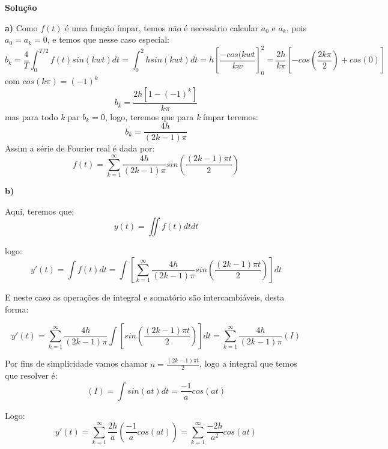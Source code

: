 \linespread{1.5}

\textbf{Solução}

\textbf{a)}
Como $f(t)$ é uma função ímpar, temos não é necessário calcular $a_0$ e $a_k$, pois $a_0 = a_k = 0$, e temos que nesse caso especial:
\begin{equation*}
    b_k = \frac{4}{T}\int_0^{T/2} f(t) sin(kwt)dt = \int_0^2 h sin(kwt)dt = h\left[\frac{-cos(kwt}{kw}\right]^2_0 = \frac{2h}{k\pi}[-cos(\frac{2k\pi}{2}) + cos(0)]
\end{equation*}
com $cos(k\pi) = (-1)^k$
\begin{equation*}
    b_k = \frac{2h[1-(-1)^k]}{k\pi}
\end{equation*}
mas para todo \textit{k} par $b_k = 0$, logo, teremos que para \textit{k} ímpar teremos:
\begin{equation*}
    b_k = \frac{4h}{(2k-1)\pi}
\end{equation*}
Assim a série de Fourier real é dada por:
\begin{equation*}
    \boxed{ f(t) = \sum_{k=1}^\infty \frac{4h}{(2k-1)\pi}sin\left(\frac{(2k-1)\pi t}{2}\right) }
\end{equation*}

\textbf{b)}

Aqui, teremos que:
\begin{equation*}
    y(t) = \iint f(t) dtdt
\end{equation*}

logo:
\begin{equation*}
    y'(t) = \int f(t) dt = \int \left[\sum_{k=1}^\infty \frac{4h}{(2k-1)\pi}sin\left(\frac{(2k-1)\pi t}{2}\right)\right]dt
\end{equation*}

E neste caso as operações de integral e somatório são intercambiáveis, desta forma:

\begin{equation*}
    y'(t) = \sum_{k=1}^\infty \frac{4h}{(2k-1)\pi}\int \left[sin\left(\frac{(2k-1)\pi t}{2}\right)\right]dt = \sum_{k=1}^\infty \frac{4h}{(2k-1)\pi}(I)
\end{equation*}

Por fins de simplicidade vamos chamar $a = \frac{(2k-1)\pi t}{2}$, logo a integral que temos que resolver é:
\begin{equation*}
    (I) = \int sin(at)dt = \frac{-1}{a}cos(at)
\end{equation*}

Logo:
\begin{equation*}
    y'(t) = \sum_{k=1}^\infty \frac{2h}{a}\left(\frac{-1}{a}cos(at)\right) = \sum_{k=1}^\infty \frac{-2h}{a^2}cos(at)
\end{equation*}

